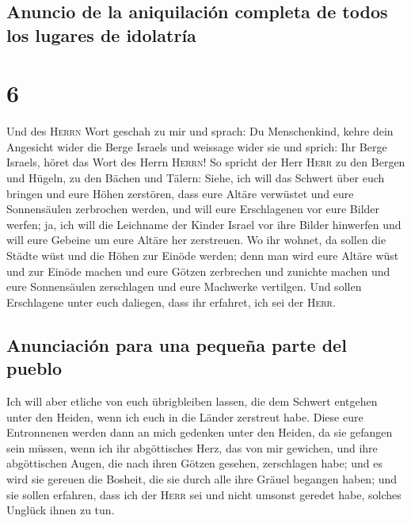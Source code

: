 \hypertarget{anuncio-de-la-aniquilaciuxf3n-completa-de-todos-los-lugares-de-idolatruxeda}{%
\subsection{Anuncio de la aniquilación completa de todos los lugares de
idolatría}\label{anuncio-de-la-aniquilaciuxf3n-completa-de-todos-los-lugares-de-idolatruxeda}}

\hypertarget{section-5}{%
\section{6}\label{section-5}}

 Und des \textsc{Herrn} Wort geschah zu mir und sprach:
 Du Menschenkind, kehre dein Angesicht wider die Berge
Israels und weissage wider sie  und sprich: Ihr Berge
Israels, höret das Wort des Herrn \textsc{Herrn}! So spricht der Herr
\textsc{Herr} zu den Bergen und Hügeln, zu den Bächen und Tälern: Siehe,
ich will das Schwert über euch bringen und eure Höhen zerstören,
 dass eure Altäre verwüstet und eure Sonnensäulen
zerbrochen werden, und will eure Erschlagenen vor eure Bilder werfen;
 ja, ich will die Leichname der Kinder Israel vor ihre
Bilder hinwerfen und will eure Gebeine um eure Altäre her zerstreuen.
 Wo ihr wohnet, da sollen die Städte wüst und die Höhen
zur Einöde werden; denn man wird eure Altäre wüst und zur Einöde machen
und eure Götzen zerbrechen und zunichte machen und eure Sonnensäulen
zerschlagen und eure Machwerke vertilgen.  Und sollen
Erschlagene unter euch daliegen, dass ihr erfahret, ich sei der
\textsc{Herr}.

\hypertarget{anunciaciuxf3n-para-una-pequeuxf1a-parte-del-pueblo}{%
\subsection{Anunciación para una pequeña parte del
pueblo}\label{anunciaciuxf3n-para-una-pequeuxf1a-parte-del-pueblo}}

 Ich will aber etliche von euch übrigbleiben lassen, die
dem Schwert entgehen unter den Heiden, wenn ich euch in die Länder
zerstreut habe.  Diese eure Entronnenen werden dann an
mich gedenken unter den Heiden, da sie gefangen sein müssen, wenn ich
ihr abgöttisches Herz, das von mir gewichen, und ihre abgöttischen
Augen, die nach ihren Götzen gesehen, zerschlagen habe; und es wird sie
gereuen die Bosheit, die sie durch alle ihre Gräuel begangen haben;
 und sie sollen erfahren, dass ich der \textsc{Herr} sei
und nicht umsonst geredet habe, solches Unglück ihnen zu tun.

